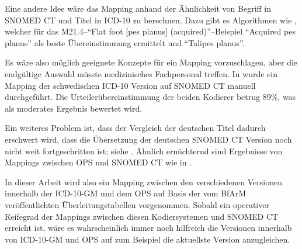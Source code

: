 Eine andere Idee wäre das Mapping anhand der Ähnlichkeit von Begriff in SNOMED CT und Titel in ICD-10 zu berechnen. Dazu gibt es Algorithmen wie \cite{jaro-winkler}, welcher für das M21.4--"`Flat foot [pes planus] (acquired)"'--Beispiel "`Acquired pes planus"' als beste Übereinstimmung ermittelt und \cite{smith-waterman-gotoh} "`Talipes planus"'.

Es wäre also möglich geeignete Konzepte für ein Mapping vorzuschlagen, aber die endgültige Auswahl müsste medizinisches Fachpersonal treffen. In \cite{manual-map} wurde ein Mapping der schwedischen ICD-10 Version auf SNOMED CT manuell durchgeführt. Die Urteilerübereinstimmung der beiden Kodierer betrug 89\%, was als moderates Ergebnis bewertet wird.

Ein weiteres Problem ist, dass der Vergleich der deutschen Titel dadurch erschwert wird, dass die Übersetzung der deutschen SNOMED CT Version noch nicht weit fortgeschritten ist; siehe \cite{gmds}. Ähnlich ernüchternd sind Ergebnisse von Mappings zwischen OPS und SNOMED CT wie in \cite{schulz2019aligning}.

In dieser Arbeit wird also ein Mapping zwischen den verschiedenen Versionen innerhalb der ICD-10-GM und dem OPS  auf Basis der vom BfArM veröffentlichten Überleitungstabellen vorgenommen. Sobald ein operativer Reifegrad der Mappings zwischen diesen Kodiersystemen und SNOMED CT erreicht ist, wäre es wahrscheinlich immer noch hilfreich die Versionen innerhalb von ICD-10-GM und OPS auf zum Beispiel die aktuellste Version anzugleichen. 


\begin{comment}
M21.4
Flat foot [pes planus] (acquired)

Jaro-Winkler: Acquired pes planus 
Smith Waterman Gotoh: Talipes planus
\end{comment}




